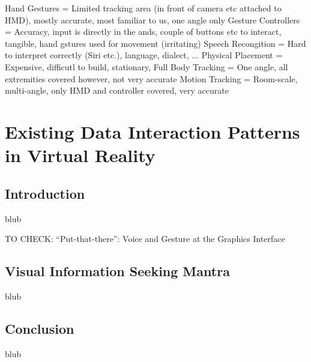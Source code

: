 Hand Gestures = Limited tracking area (in front of camera etc attached to HMD), mostly accurate, most familiar to us, one angle only
Gesture Controllers = Accuracy, input is directly in the ands, couple of buttons etc to interact, tangible, hand gstures used for movement (irritating)
Speech Recongition = Hard to interpret correctly (Siri etc.), language, dialect, ...
Physical Placement = Expensive, difficutl to build, stationary, 
Full Body Tracking = One angle, all extremities covered however, not very accurate
Motion Tracking = Room-scale, multi-angle, only HMD and controller covered, very accurate



\section{Existing Data Interaction Patterns in Virtual Reality}

\label{SectionLiteratureReviewSRQ2}


\subsection{Introduction}

blub


TO CHECK: “Put-that-there”: Voice and Gesture at the Graphics Interface \citep{Bolt1980}


\subsection{Visual Information Seeking Mantra}

blub


\subsection{Conclusion}

blub



